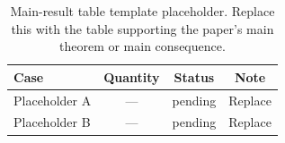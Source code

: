 \begin{table}[t]
\caption{Main-result table template placeholder. Replace this with the table
supporting the paper's main theorem or main consequence.}
\label{tbl:table-template-main}
\centering
\small
\begin{tabular}{@{}l c c c@{}}
\toprule
Case & Quantity & Status & Note \\
\midrule
Placeholder A & --- & pending & Replace \\
Placeholder B & --- & pending & Replace \\
\bottomrule
\end{tabular}
\end{table}
